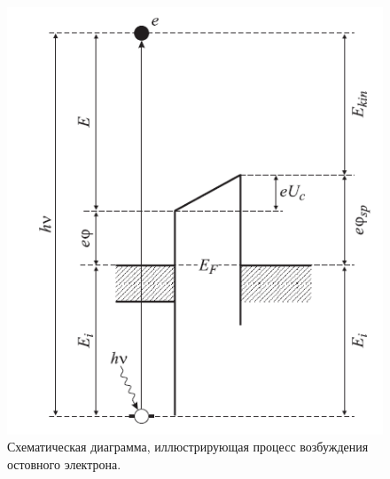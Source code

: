  \begin{figure}[ht] 
  \center
  \includegraphics [scale=0.47] {./Dissertation/images/pes.png}
  \caption{Схематическая диаграмма, иллюстрирующая процесс возбуждения остовного электрона.} 
  \label{img:pes}  
\end{figure}


